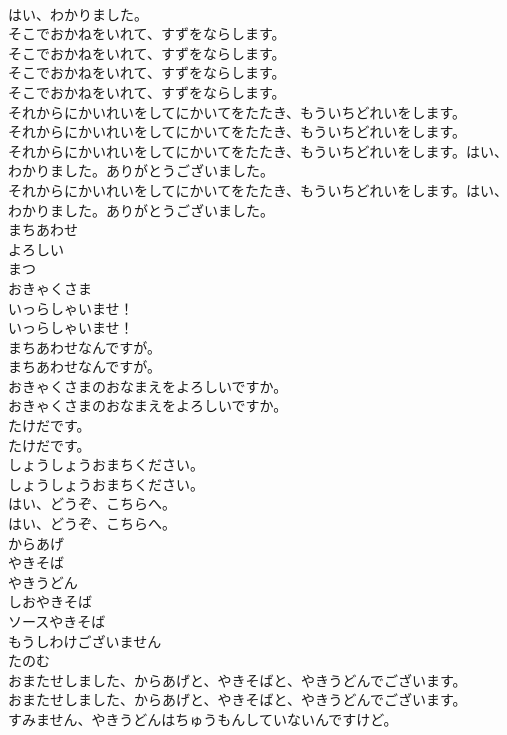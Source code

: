 \documentclass[8pt]{extreport}
\begin{document}
\begin{CJK}{UTF8}{min}
\\	はい、わかりました。 
\\	そこでおかねをいれて、すずをならします。	
\\	そこでおかねをいれて、すずをならします。 
\\	そこでおかねをいれて、すずをならします。	
\\	そこでおかねをいれて、すずをならします。 
\\	それからにかいれいをしてにかいてをたたき、もういちどれいをします。	
\\	それからにかいれいをしてにかいてをたたき、もういちどれいをします。 
\\	それからにかいれいをしてにかいてをたたき、もういちどれいをします。はい、わかりました。ありがとうございました。	
\\	それからにかいれいをしてにかいてをたたき、もういちどれいをします。はい、わかりました。ありがとうございました。 
\\	まちあわせ
\\	よろしい
\\	まつ
\\	おきゃくさま
\\	いっらしゃいませ！	
\\	いっらしゃいませ！ 
\\	まちあわせなんですが。	
\\	まちあわせなんですが。 
\\	おきゃくさまのおなまえをよろしいですか。	
\\	おきゃくさまのおなまえをよろしいですか。 
\\	たけだです。	
\\	たけだです。 
\\	しょうしょうおまちください。	
\\	しょうしょうおまちください。 
\\	はい、どうぞ、こちらへ。	
\\	はい、どうぞ、こちらへ。 
\\	からあげ
\\	やきそば
\\	やきうどん
\\	しおやきそば
\\	ソースやきそば
\\	もうしわけございません
\\	たのむ
\\	おまたせしました、からあげと、やきそばと、やきうどんでございます。	
\\	おまたせしました、からあげと、やきそばと、やきうどんでございます。 
\\	すみません、やきうどんはちゅうもんしていないんですけど。	

\end{CJK}
\end{document}
